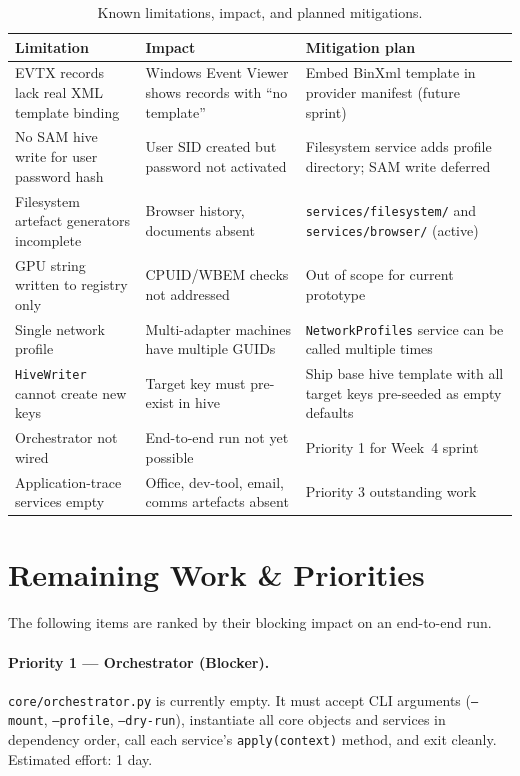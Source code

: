 \documentclass[12pt,a4paper]{article}
\begin{document}
\begin{table}[H]
\centering
\small
\caption{Known limitations, impact, and planned mitigations.}
\label{tab:limits}
\begin{tabularx}{\linewidth}{@{}p{3.6cm} X p{3.6cm}@{}}
\toprule
\textbf{Limitation} & \textbf{Impact} & \textbf{Mitigation plan} \\
\midrule
EVTX records lack real XML template binding
  & Windows Event Viewer shows records with ``no template''
  & Embed BinXml template in provider manifest (future sprint) \\[4pt]
No SAM hive write for user password hash
  & User SID created but password not activated
  & Filesystem service adds profile directory; SAM write deferred \\[4pt]
Filesystem artefact generators incomplete
  & Browser history, documents absent
  & \texttt{services/filesystem/} and \texttt{services/browser/} (active) \\[4pt]
GPU string written to registry only
  & CPUID/WBEM checks not addressed
  & Out of scope for current prototype \\[4pt]
Single network profile
  & Multi-adapter machines have multiple GUIDs
  & \texttt{NetworkProfiles} service can be called multiple times \\[4pt]
\texttt{HiveWriter} cannot create new keys
  & Target key must pre-exist in hive
  & Ship base hive template with all target keys pre-seeded as empty defaults \\[4pt]
Orchestrator not wired
  & End-to-end run not yet possible
  & Priority 1 for Week~4 sprint \\[4pt]
Application-trace services empty
  & Office, dev-tool, email, comms artefacts absent
  & Priority 3 outstanding work \\
\bottomrule
\end{tabularx}
\end{table}

\section{Remaining Work \& Priorities}
\label{sec:remaining}

The following items are ranked by their blocking impact on an end-to-end run.

\paragraph{Priority 1 — Orchestrator (Blocker).}
\texttt{core/orchestrator.py} is currently empty.  It must accept CLI
arguments (\texttt{--mount}, \texttt{--profile}, \texttt{--dry-run}),
instantiate all core objects and services in dependency order, call each
service's \texttt{apply(context)} method, and exit cleanly.  Estimated
effort: 1 day.
\end{document}
